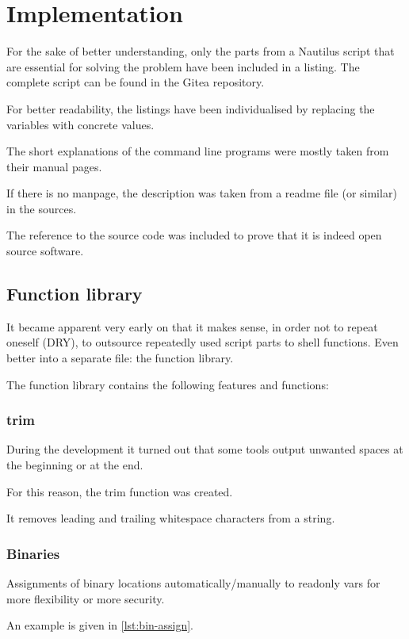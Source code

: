 \chapter{Implementation}
\label{chap:implementation}

For the sake of better understanding, only the parts from a Nautilus script that are essential for solving the problem have been included in a listing. The complete script can be found in the Gitea repository.

For better readability, the listings have been individualised by replacing the variables with concrete values.

The short explanations of the command line programs were mostly taken from their manual pages.

If there is no manpage, the description was taken from a readme file (or similar) in the sources.

The reference to the source code was included to prove that it is indeed open source software.

\section{Function library}

It became apparent very early on that it makes sense, in order not to repeat oneself (DRY), to outsource repeatedly used script parts to shell functions. Even better into a separate file: the function library.

The function library contains the following features and functions:

\subsection{trim}

During the development it turned out that some tools output unwanted spaces at the beginning or at the end.

For this reason, the trim function was created.

It removes leading and trailing whitespace characters from a string.

\subsection{Binaries}

Assignments of binary locations automatically/manually to readonly vars for more flexibility or more security.

An example is given in \cref{lst:bin-assign}.

